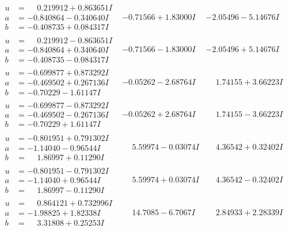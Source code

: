 \documentclass[1p]{elsarticle_modified}
\theoremstyle{definition}
\begin{document}
$$\begin{array}{c|c|c}
\begin{aligned}
u &= \phantom{-}0.219912 + 0.863651 I \\
a &= -0.840864 - 0.340640 I \\
b &= -0.408735 + 0.084317 I\end{aligned}
 & -0.71566 + 1.83000 I & -2.05496 - 5.14676 I \\ \hline\begin{aligned}
u &= \phantom{-}0.219912 - 0.863651 I \\
a &= -0.840864 + 0.340640 I \\
b &= -0.408735 - 0.084317 I\end{aligned}
 & -0.71566 - 1.83000 I & -2.05496 + 5.14676 I \\ \hline\begin{aligned}
u &= -0.699877 + 0.873292 I \\
a &= -0.469502 + 0.267136 I \\
b &= -0.70229 - 1.61147 I\end{aligned}
 & -0.05262 - 2.68764 I & \phantom{-}1.74155 + 3.66223 I \\ \hline\begin{aligned}
u &= -0.699877 - 0.873292 I \\
a &= -0.469502 - 0.267136 I \\
b &= -0.70229 + 1.61147 I\end{aligned}
 & -0.05262 + 2.68764 I & \phantom{-}1.74155 - 3.66223 I \\ \hline\begin{aligned}
u &= -0.801951 + 0.791302 I \\
a &= -1.14040 - 0.96544 I \\
b &= \phantom{-}1.86997 + 0.11290 I\end{aligned}
 & \phantom{-}5.59974 - 0.03074 I & \phantom{-}4.36542 + 0.32402 I \\ \hline\begin{aligned}
u &= -0.801951 - 0.791302 I \\
a &= -1.14040 + 0.96544 I \\
b &= \phantom{-}1.86997 - 0.11290 I\end{aligned}
 & \phantom{-}5.59974 + 0.03074 I & \phantom{-}4.36542 - 0.32402 I \\ \hline\begin{aligned}
u &= \phantom{-}0.864121 + 0.732996 I \\
a &= -1.98825 + 1.82338 I \\
b &= \phantom{-}3.31808 + 0.25253 I\end{aligned}
 & \phantom{-}14.7085 - 6.7067 I & \phantom{-}2.84933 + 2.28339 I \\ \hline\begin{aligned}

\end{aligned}
\end{array}$$
\end{document}
